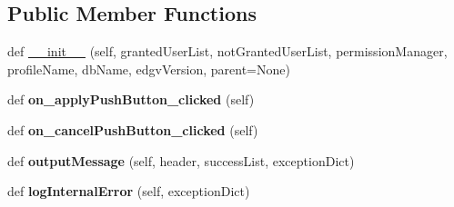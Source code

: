 \subsection*{Public Member Functions}
\begin{DoxyCompactItemize}
\item 
def \mbox{\hyperlink{class_dsg_tools_1_1_user_tools_1_1profile_user_manager_1_1_profile_user_manager_a6712af6b0351580186fd3aeb200273ab}{\+\_\+\+\_\+init\+\_\+\+\_\+}} (self, granted\+User\+List, not\+Granted\+User\+List, permission\+Manager, profile\+Name, db\+Name, edgv\+Version, parent=None)
\item 
\mbox{\label{class_dsg_tools_1_1_user_tools_1_1profile_user_manager_1_1_profile_user_manager_a1945e7af99888e116d42b93ecedbedb1}} 
def {\bfseries on\+\_\+apply\+Push\+Button\+\_\+clicked} (self)
\item 
\mbox{\label{class_dsg_tools_1_1_user_tools_1_1profile_user_manager_1_1_profile_user_manager_a89a238413b44b6d01c2c4c0264105b52}} 
def {\bfseries on\+\_\+cancel\+Push\+Button\+\_\+clicked} (self)
\item 
\mbox{\label{class_dsg_tools_1_1_user_tools_1_1profile_user_manager_1_1_profile_user_manager_acef2c034833da1cbda1c9dbad4641140}} 
def {\bfseries output\+Message} (self, header, success\+List, exception\+Dict)
\item 
\mbox{\label{class_dsg_tools_1_1_user_tools_1_1profile_user_manager_1_1_profile_user_manager_ae519ef0603272a20b859dc83d6c30c8a}} 
def {\bfseries log\+Internal\+Error} (self, exception\+Dict)
\end{DoxyCompactItemize}
